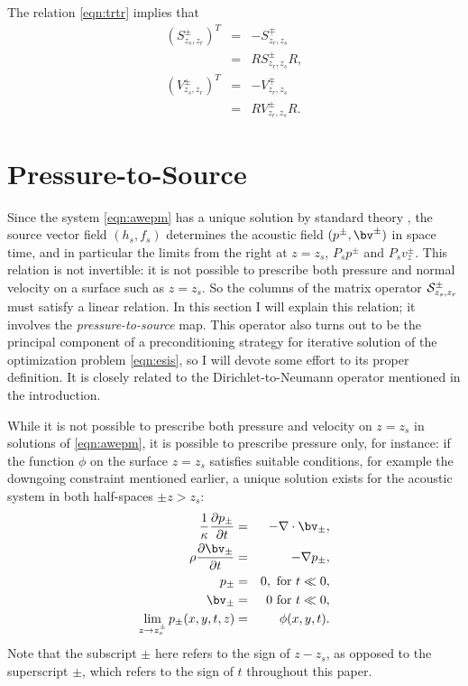 The relation \ref{eqn:trtr} implies that
\begin{eqnarray}
  (S^{\pm}_{z_s,z_r})^T &=& -S^{\mp}_{z_r,z_s} \nonumber\\
                        &=& R S^{\pm}_{z_r,z_s}R, \nonumber\\
    (V^{\pm}_{z_s,z_r})^T &=& -V^{\mp}_{z_r,z_s} \nonumber\\
                        &=& R V^{\pm}_{z_r,z_s}R.
                            \label{eqn:trtrcomp}
\end{eqnarray}




\section{Pressure-to-Source}

Since the system \ref{eqn:awepm} has a unique solution by standard
theory \cite[]{Lax:PDENotes}, the source vector field $(h_s,f_s)$
determines the acoustic field $(p^{\pm},\bv^{\pm})$ in space time, and
in particular the limits from the right at $z=z_s$, $P_sp^{\pm}$ and
$P_sv_z^{\pm}$. This relation is not invertible: it is not possible to
prescribe both pressure and normal velocity on a surface such as
$z=z_s$. So the columns of the matrix operator
${\cal S}^{\pm}_{z_s,z_r}$ must satisfy a linear relation. In this
section I will explain this relation; it involves the {\em
  pressure-to-source} map. This operator also turns out to be the
principal component of a preconditioning strategy for iterative
solution of the optimization problem \ref{eqn:esis}, so I will devote
some effort to its proper definition. It is closely related to the
Dirichlet-to-Neumann operator mentioned in the introduction.

While it is not possible to prescribe both pressure and velocity on
$z=z_s$ in solutions of \ref{eqn:awepm}, it is possible to
prescribe pressure only, for instance: if the function $\phi$ on
the surface $z=z_s$ satisfies suitable conditions, for
example the downgoing constraint mentioned earlier, a unique solution
exists for the acoustic system in both half-spaces $\pm z > z_s$:
\begin{eqnarray}
\label{eqn:awe0}
  \frac{1}{\kappa}\frac{\partial p_{\pm}}{\partial t} & = & - \nabla \cdot \bv_{\pm}, \nonumber \\
  \rho\frac{\partial \bv_{\pm}}{\partial t} & = & - \nabla
                                                    p_{\pm}, \nonumber \\
  p_{\pm} & =& 0,  \mbox{ for } t \ll 0, \nonumber\\ 
  \bv_{\pm} & = & 0 \mbox{ for } t \ll 0, \nonumber\\
  \lim_{z \rightarrow z_s^{\pm}}p_{\pm}(x,y,t,z)& =& \phi(x,y,t).
\end{eqnarray}
Note that the subscript $\pm$ here refers to the sign of $z-z_s$, as opposed
to the superscript ${\pm}$, which refers to the sign of $t$ throughout
this paper.

